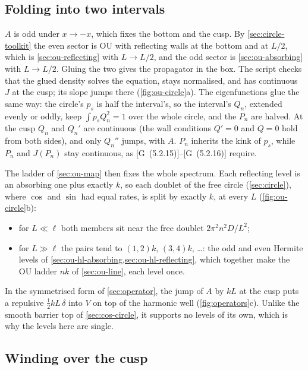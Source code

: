 \documentclass[11pt]{article}
\numberwithin{equation}{section}
\newcommand{\G}[1]{[G~(#1)]}
\begin{document}
\subsection{Folding into two intervals}

$A$ is odd under $x\to-x$, which fixes the bottom and the cusp. By \cref{sec:circle-toolkit} the even sector is
OU with reflecting walls at the bottom and at $L/2$, which is \cref{sec:ou-reflecting} with $L\to L/2$, and the
odd sector is \cref{sec:ou-absorbing} with $L\to L/2$. Gluing the two gives the propagator in the box. The
script checks that the glued density solves the equation, stays normalised, and has continuous $J$ at the
cusp; its slope jumps there (\cref{fig:ou-circle}a). The eigenfunctions glue the same way: the circle's $p_s$ is
half the interval's, so the interval's $Q_n$, extended evenly or oddly, keep $\int p_sQ_n^2=1$ over the whole
circle, and the $P_n$ are halved. At the cusp $Q_n$ and $Q_n'$ are continuous (the wall conditions $Q'=0$ and
$Q=0$ hold from both sides), and only $Q_n''$ jumps, with $A$. $P_n$ inherits the kink of $p_s$, while $P_n$ and
$J(P_n)$ stay continuous, as \G{5.2.15}--\G{5.2.16} require.

The ladder of \cref{sec:ou-map} then fixes the whole spectrum. Each reflecting level is an absorbing one plus
exactly $k$, so each doublet of the free circle (\cref{sec:circle}), where $\cos$ and $\sin$ had equal rates,
is split by exactly $k$, at every $L$ (\cref{fig:ou-circle}b):
\begin{itemize}
  \item for $L\ll\ell$ both members sit near the free doublet $2\pi^2n^2D/L^2$;
  \item for $L\gg\ell$ the pairs tend to $(1,2)k$, $(3,4)k$, \dots: the odd and even Hermite levels of
        \cref{sec:ou-hl-absorbing,sec:ou-hl-reflecting}, which together make the OU ladder $nk$ of
        \cref{sec:ou-line}, each level once.
\end{itemize}
In the symmetrised form of \cref{sec:operator}, the jump of $A$ by $kL$ at the cusp puts a repulsive
$\tfrac12kL\,\delta$ into $V$ on top of the harmonic well (\cref{fig:operators}c). Unlike the smooth barrier top
of \cref{sec:cos-circle}, it supports no levels of its own, which is why the levels here are single.

\subsection{Winding over the cusp}
\end{document}
